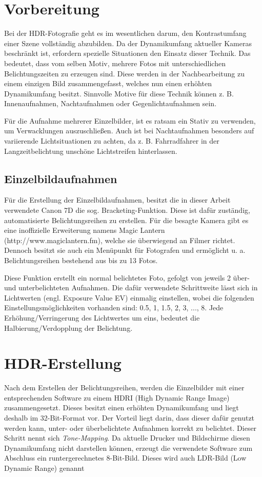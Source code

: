 \documentclass[liststotoc,bibtotoc,fontsize=14pt,]{scrreprt}
\begin{document}
	\chapter{Vorbereitung}
		Bei der HDR-Fotografie geht es im wesentlichen darum, den Kontrastumfang einer Szene vollständig abzubilden. Da der Dynamikumfang aktueller Kameras beschränkt ist, erfordern spezielle Situationen den Einsatz dieser Technik. Das bedeutet, dass vom selben Motiv, mehrere Fotos mit unterschiedlichen Belichtungszeiten zu erzeugen sind. Diese werden in der Nachbearbeitung zu einem einzigen Bild zusammengefasst, welches nun einen erhöhten Dynamikumfang besitzt. Sinnvolle Motive für diese Technik können z. B. Innenaufnahmen, Nachtaufnahmen oder Gegenlichtaufnahmen sein.
		
		\bigskip
		Für die Aufnahme mehrerer Einzelbilder, ist es ratsam ein Stativ zu verwenden, um Verwacklungen auszuschließen. Auch ist bei Nachtaufnahmen besonders auf variierende Lichtsituationen zu achten, da z. B. Fahrradfahrer in der Langzeitbelichtung unschöne Lichtstreifen hinterlassen.
	
	\section{Einzelbildaufnahmen}
	\label{sec:einzel}
		Für die Erstellung der Einzelbildaufnahmen, besitzt die in dieser Arbeit verwendete Canon 7D die sog. Bracketing-Funktion. Diese ist dafür zuständig, automatisierte Belichtungsreihen zu erstellen. Für die besagte Kamera gibt es eine inoffizielle Erweiterung namens \grqq{}Magic Lantern\grqq{} (http://www.magiclantern.fm), welche sie überwiegend an Filmer richtet. Dennoch besitzt sie auch ein Menüpunkt für Fotografen und ermöglicht u. a. Belichtungsreihen bestehend aus bis zu 13 Fotos.
		
		\bigskip
		Diese Funktion erstellt ein normal belichtetes Foto, gefolgt von jeweils 2 über- und unterbelichteten Aufnahmen. Die dafür verwendete Schrittweite lässt sich in Lichtwerten (engl. Exposure Value EV) einmalig einstellen, wobei die folgenden Einstellungsmöglichkeiten vorhanden sind: 0.5, 1, 1.5, 2, 3, ..., 8. Jede Erhöhung/Verringerung des Lichtwertes um eins, bedeutet die Halbierung/Verdopplung der Belichtung. 
		


	\chapter{HDR-Erstellung}
	\label{ch:processing}
		Nach dem Erstellen der Belichtungsreihen, werden die Einzelbilder mit einer entsprechenden Software zu einem HDRI (High Dynamic Range Image) zusammengesetzt. Dieses besitzt einen erhöhten Dynamikumfang und liegt deshalb im 32-Bit-Format vor. Der Vorteil liegt darin, dass dieser dafür genutzt werden kann, unter- oder überbelichtete Aufnahmen korrekt zu belichtet. Dieser Schritt nennt sich \textit{Tone-Mapping}.
		Da aktuelle Drucker und Bildschirme diesen Dynamikumfang nicht darstellen können, erzeugt die verwendete Software zum Abschluss ein runtergerechnetes 8-Bit-Bild. Dieses wird auch LDR-Bild (Low Dynamic Range) genannt 
		
\end{document}
